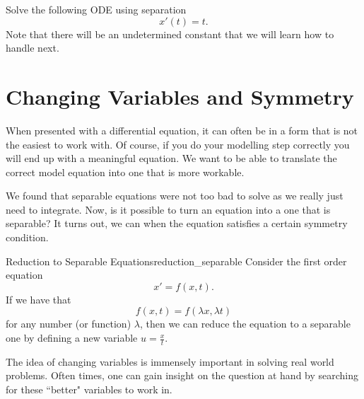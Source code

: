         \begin{exercise}
        Solve the following ODE using separation
        \[
        x'(t)=t.
        \]
        Note that there will be an undetermined constant that we will learn how to handle next.
        \end{exercise}
        
        \section{Changing Variables and Symmetry}
        
        When presented with a differential equation, it can often be in a form that is not the easiest to work with.  Of course, if you do your modelling step correctly you will end up with a meaningful equation.  We want to be able to translate the correct model equation into one that is more workable.  
        
        We found that separable equations were not too bad to solve as we really just need to integrate.  Now, is it possible to turn an equation into a one that is separable? It turns out, we can when the equation satisfies a certain symmetry condition.  
        
        \begin{prop}{Reduction to Separable Equations}{reduction_separable}
            Consider the first order equation
            \[
            x'=f(x,t).
            \]
            If we have that
            \[
            f(x,t)=f(\lambda x, \lambda t)
            \]
            for any number (or function) $\lambda$, then we can reduce the equation to a separable one by defining a new variable $u=\frac{x}{t}$.
        \end{prop}
        
        The idea of changing variables is immensely important in solving real world problems.  Often times, one can gain insight on the question at hand by searching for these ``better" variables to work in.  
        
